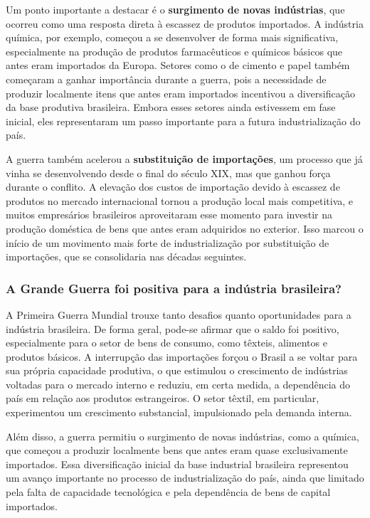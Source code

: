 \documentclass[a4paper,12pt]{article}[abntex2]
\begin{document}
Um ponto importante a destacar é o \textbf{surgimento de novas indústrias}, que ocorreu como uma resposta direta à escassez de produtos importados. A indústria química, por exemplo, começou a se desenvolver de forma mais significativa, especialmente na produção de produtos farmacêuticos e químicos básicos que antes eram importados da Europa. Setores como o de cimento e papel também começaram a ganhar importância durante a guerra, pois a necessidade de produzir localmente itens que antes eram importados incentivou a diversificação da base produtiva brasileira. Embora esses setores ainda estivessem em fase inicial, eles representaram um passo importante para a futura industrialização do país.

A guerra também acelerou a \textbf{substituição de importações}, um processo que já vinha se desenvolvendo desde o final do século XIX, mas que ganhou força durante o conflito. A elevação dos custos de importação devido à escassez de produtos no mercado internacional tornou a produção local mais competitiva, e muitos empresários brasileiros aproveitaram esse momento para investir na produção doméstica de bens que antes eram adquiridos no exterior. Isso marcou o início de um movimento mais forte de industrialização por substituição de importações, que se consolidaria nas décadas seguintes.

\subsubsection{A Grande Guerra foi positiva para a indústria brasileira?}

A Primeira Guerra Mundial trouxe tanto desafios quanto oportunidades para a indústria brasileira. De forma geral, pode-se afirmar que o saldo foi positivo, especialmente para o setor de bens de consumo, como têxteis, alimentos e produtos básicos. A interrupção das importações forçou o Brasil a se voltar para sua própria capacidade produtiva, o que estimulou o crescimento de indústrias voltadas para o mercado interno e reduziu, em certa medida, a dependência do país em relação aos produtos estrangeiros. O setor têxtil, em particular, experimentou um crescimento substancial, impulsionado pela demanda interna.

Além disso, a guerra permitiu o surgimento de novas indústrias, como a química, que começou a produzir localmente bens que antes eram quase exclusivamente importados. Essa diversificação inicial da base industrial brasileira representou um avanço importante no processo de industrialização do país, ainda que limitado pela falta de capacidade tecnológica e pela dependência de bens de capital importados.
\end{document}
